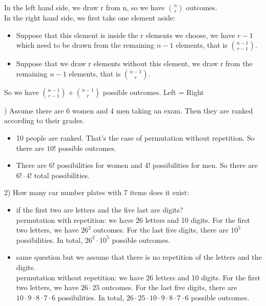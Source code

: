 \documentclass[12pt,a4paper,titlepage]{article}
\begin{document}
\begin{enumerate}
In the left hand side, we draw r from n, so we have ${n \choose r}$ outcomes.\\
In the right hand side, we first take one element aside:
\begin{itemize}
\item Suppose that this element is inside the r elements we choose, we have $r-1$ which need to be drawn from the remaining $n-1$ elements, that is ${n-1 \choose r-1}$.
\item Suppose that we draw r elements without this element, we draw r from the remaining $n-1$ elements, that is ${n-1 \choose r}$.
\end{itemize}
So we have ${n-1 \choose r-1}+{n-1 \choose r}$ possible outcomes. Left = Right
\end{enumerate}

) Assume there are 6 women and 4 men taking an exam. Then they are ranked according to their grades.
\begin{itemize}
\item 10 people are ranked. That's the case of permutation without repetition. So there are $10!$ possible outcomes.
\item There are $6!$ possibilities for women and $4!$ possibilities for men. So there are $6!\cdot4!$ total possibilities.
\end{itemize}
2) How many car number plates with 7 items does it exist:
\begin{itemize}
  \item if the first two are letters and the five last are digits?\\
permutation with repetition: we have 26 letters and 10 digits. For the first two letters, we have $26^2$ outcomes. For the last five digits, there are $10^5$ possibilities. In total, $26^2\cdot10^5$ possible outcomes.

  \item same question but we assume that there is no repetition of the letters and the digits.\\
permutation without repetition: we have 26 letters and 10 digits. For the first two letters, we have $26\cdot25$ outcomes. For the last five digits, there are $10\cdot 9\cdot8\cdot7\cdot6$ possibilities. In total, $26\cdot25\cdot10\cdot 9\cdot8\cdot7\cdot6$ possible outcomes.

\end{itemize}
\end{document}
